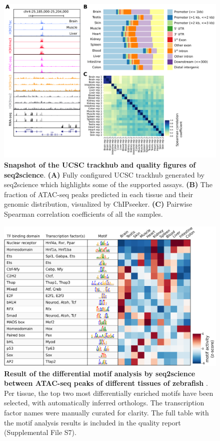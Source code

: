 \begin{figure}
	\centering
	\includegraphics[width=1.0\textwidth]{ch.seq2science/imgs/zebrafish_fig1.png}
	\caption{\label{fig:zebrafish_fig1} \textbf{Snapshot of the UCSC trackhub and quality figures of seq2science}. \textbf{(A)} Fully configured UCSC trackhub generated by seq2science which highlights some of the supported assays. \textbf{(B)}  The fraction of ATAC-seq peaks predicted in each tissue and their genomic distribution, visualized by ChIPseeker. \textbf{(C)} Pairwise Spearman correlation coefficients of all the samples. }
\end{figure}

\begin{figure}
	\centering
	\includegraphics[width=\textwidth]{ch.seq2science/imgs/zebrafish_fig2.png}
	\caption{\label{fig:zebrafish_fig2} \textbf{Result of the differential motif analysis by seq2science between ATAC-seq peaks of different tissues of zebrafish} \cite{Yang2020}. Per tissue, the top two most differentially enriched motifs have been selected, with automatically inferred orthologs. The transcription factor names were manually curated for clarity. The full table with the motif analysis results is included in the quality report (Supplemental File S7).}
\end{figure}

